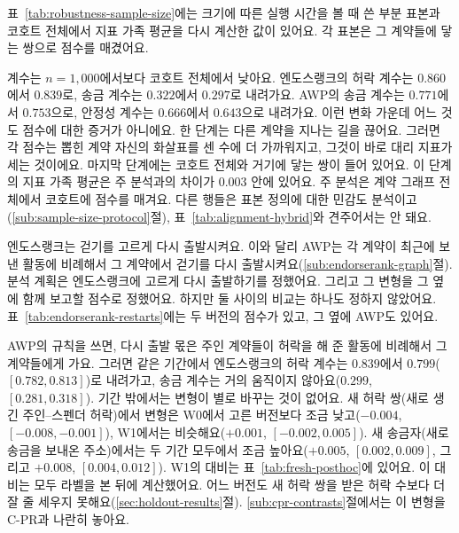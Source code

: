
표~\ref{tab:robustness-sample-size}에는 크기에 따른 실행 시간을 볼 때 쓴 부분 표본과 코호트 전체에서 지표 가족 평균을 다시 계산한 값이 있어요. 각 표본은 그 계약들에 닿는 쌍으로 점수를 매겼어요.



계수는 $n=1{,}000$에서보다 코호트 전체에서 낮아요. 엔도스랭크의 허락 계수는 $0.860$에서 $0.839$로, 송금 계수는 $0.322$에서 $0.297$로 내려가요. AWP의 송금 계수는 $0.771$에서 $0.753$으로, 안정성 계수는 $0.666$에서 $0.643$으로 내려가요. 이런 변화 가운데 어느 것도 점수에 대한 증거가 아니에요. 한 단계는 다른 계약을 지나는 길을 끊어요. 그러면 각 점수는 뽑힌 계약 자신의 화살표를 센 수에 더 가까워지고, 그것이 바로 대리 지표가 세는 것이에요. 마지막 단계에는 코호트 전체와 거기에 닿는 쌍이 들어 있어요. 이 단계의 지표 가족 평균은 주 분석과의 차이가 $0.003$ 안에 있어요. 주 분석은 계약 그래프 전체에서 코호트에 점수를 매겨요. 다른 행들은 표본 정의에 대한 민감도 분석이고(\ref{sub:sample-size-protocol}절), 표~\ref{tab:alignment-hybrid}와 견주어서는 안 돼요.


엔도스랭크는 걷기를 고르게 다시 출발시켜요. 이와 달리 AWP는 각 계약이 최근에 보낸 활동에 비례해서 그 계약에서 걷기를 다시 출발시켜요(\ref{sub:endorserank-graph}절). 분석 계획은 엔도스랭크에 고르게 다시 출발하기를 정했어요. 그리고 그 변형을 그 옆에 함께 보고할 점수로 정했어요. 하지만 둘 사이의 비교는 하나도 정하지 않았어요. 표~\ref{tab:endorserank-restarts}에는 두 버전의 점수가 있고, 그 옆에 AWP도 있어요.



AWP의 규칙을 쓰면, 다시 출발 몫은 주인 계약들이 허락을 해 준 활동에 비례해서 그 계약들에게 가요. 그러면 같은 기간에서 엔도스랭크의 허락 계수는 $0.839$에서 $0.799$($[0.782,0.813]$)로 내려가고, 송금 계수는 거의 움직이지 않아요($0.299$, $[0.281,0.318]$). 기간 밖에서는 변형이 별로 바꾸는 것이 없어요. 새 허락 쌍(새로 생긴 주인–스펜더 허락)에서 변형은 W0에서 고른 버전보다 조금 낮고($-0.004$, $[-0.008,-0.001]$), W1에서는 비슷해요($+0.001$, $[-0.002,0.005]$). 새 송금자(새로 송금을 보내온 주소)에서는 두 기간 모두에서 조금 높아요($+0.005$, $[0.002,0.009]$, 그리고 $+0.008$, $[0.004,0.012]$). W1의 대비는 표~\ref{tab:fresh-posthoc}에 있어요. 이 대비는 모두 라벨을 본 뒤에 계산했어요. 어느 버전도 새 허락 쌍을 받은 허락 수보다 더 잘 줄 세우지 못해요(\ref{sec:holdout-results}절). \ref{sub:cpr-contrasts}절에서는 이 변형을 \mbox{C-PR}과 나란히 놓아요.

